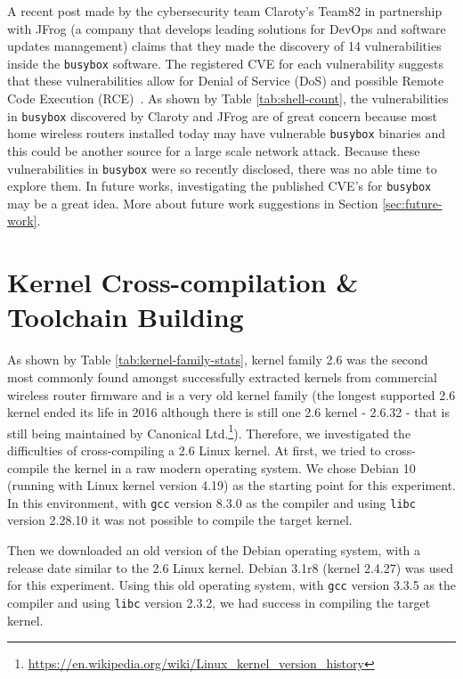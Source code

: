A recent post made by the cybersecurity team Claroty’s Team82 in partnership with JFrog (a company that develops leading solutions for DevOps and software updates management) claims that they made the discovery of 14 vulnerabilities inside the {\tt busybox} software. The registered CVE for each vulnerability suggests that these vulnerabilities allow for Denial of Service (DoS) and possible Remote Code Execution (RCE)~\cite{jfrog-busybox}. As shown by Table \ref{tab:shell-count}, the vulnerabilities in {\tt busybox} discovered by Claroty and JFrog are of great concern because most home wireless routers installed today may have vulnerable {\tt busybox} binaries and this could be another source for a large scale network attack. Because these vulnerabilities in {\tt busybox} were so recently disclosed, there was no able time to explore them. In future works, investigating the published CVE's for {\tt busybox} may be a great idea. More about future work suggestions in Section \ref{sec:future-work}.

\section{Kernel Cross-compilation \& Toolchain Building}

As shown by Table \ref{tab:kernel-family-stats}, kernel family 2.6 was the second most commonly found amongst successfully extracted kernels from commercial wireless router firmware and is a very old kernel family (the longest supported 2.6 kernel ended its life in 2016 although there is still one 2.6 kernel - 2.6.32 - that is still being maintained by Canonical Ltd.\footnote{\url{https://en.wikipedia.org/wiki/Linux_kernel_version_history}}). Therefore, we investigated the difficulties of cross-compiling a 2.6 Linux kernel. At first, we tried to cross-compile the kernel in a raw modern operating system. We chose Debian 10 (running with Linux kernel version 4.19) as the starting point for this experiment. In this environment, with {\tt gcc} version 8.3.0 as the compiler and using {\tt libc} version 2.28.10 it was not possible to compile the target kernel.

Then we downloaded an old version of the Debian operating system, with a release date similar to the 2.6 Linux kernel. Debian 3.1r8 (kernel 2.4.27) was used for this experiment. Using this old operating system, with {\tt gcc} version 3.3.5 as the compiler and using {\tt libc} version 2.3.2, we had success in compiling the target kernel.


